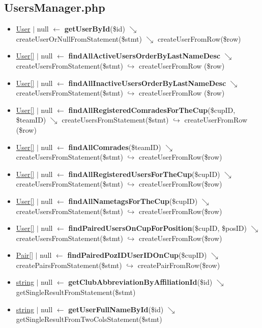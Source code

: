 \subsection{UsersManager.php}
\begin{itemize}
  \setlength\itemsep{0em}
  \item \underline{User} $\vert$ null $\leftarrow$ \textbf{getUserById}(\$id) $\searrow$ createUserOrNullFromStatement(\$stmt) $\searrow$ createUserFromRow(\$row)
  \item \underline{User[]} $\vert$ null $\leftarrow$ \textbf{findAllActiveUsersOrderByLastNameDesc} $\searrow$ createUsersFromStatement(\$stmt) $\hookrightarrow$ createUserFromRow (\$row)
  \item \underline{User[]} $\vert$ null $\leftarrow$ \textbf{findAllInactiveUsersOrderByLastNameDesc} $\searrow$ createUsersFromStatement(\$stmt) $\hookrightarrow$ createUserFromRow (\$row)
  \item \underline{User[]} $\vert$ null $\leftarrow$ \textbf{findAllRegisteredComradesForTheCup}(\$cupID, \$teamID) $\searrow$ createUsersFromStatement(\$stmt) $\hookrightarrow$ createUserFromRow (\$row)
  \item \underline{User[]} $\vert$ null $\leftarrow$ \textbf{findAllComrades}(\$teamID) $\searrow$ createUsersFromStatement(\$stmt) $\hookrightarrow$ createUserFromRow(\$row)
  \item \underline{User[]} $\vert$ null $\leftarrow$ \textbf{findAllRegisteredUsersForTheCup}(\$cupID) $\searrow$ createUsersFromStatement(\$stmt) $\hookrightarrow$ createUserFromRow(\$row)
  \item \underline{User[]} $\vert$ null $\leftarrow$ \textbf{findAllNametagsForTheCup}(\$cupID) $\searrow$ createUsersFromStatement(\$stmt) $\hookrightarrow$ createUserFromRow(\$row)
  \item \underline{User[]} $\vert$ null $\leftarrow$ \textbf{findPairedUsersOnCupForPosition}(\$cupID, \$posID) $\searrow$ createUsersFromStatement(\$stmt) $\hookrightarrow$ createUserFromRow(\$row)
  \item \underline{Pair[]} $\vert$ null $\leftarrow$ \textbf{findPairedPozIDUserIDOnCup}(\$cupID) $\searrow$ createPairsFromStatement(\$stmt) $\hookrightarrow$ createPairFromRow(\$row)
  \item \underline{string} $\vert$ null $\leftarrow$ \textbf{getClubAbbreviationByAffiliationId}(\$id) $\searrow$ getSingleResultFromStatement(\$stmt)
  \item \underline{string} $\vert$ null $\leftarrow$ \textbf{getUserFullNameById}(\$id) $\searrow$ getSingleResultFromTwoColsStatement(\$stmt)

\end{itemize}
